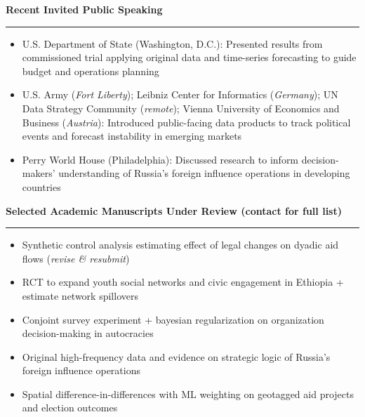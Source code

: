 \documentclass[11pt]{article}
\begin{document}

\textbf{\large Recent Invited Public Speaking}\\
\rule[3mm]{\textwidth}{.2pt}
\vspace{-25pt}
\begin{itemize} \itemsep -5pt
  \item U.S. Department of State (Washington, D.C.): Presented results from commissioned trial applying original data and time-series forecasting to guide budget and operations planning
  \item U.S. Army (\textit{Fort Liberty}); Leibniz Center for Informatics (\textit{Germany}); UN Data Strategy Community (\textit{remote}); Vienna University of Economics and Business (\textit{Austria}): Introduced public-facing data products to track political events and forecast instability in emerging markets
  \item Perry World House (Philadelphia): Discussed research to inform decision-makers' understanding of Russia's foreign influence operations in developing countries
\end{itemize}


\textbf{\large Selected Academic Manuscripts Under Review (contact for full list)}\\
\rule[3mm]{\textwidth}{.2pt}
\vspace{-25pt}
\begin{itemize} \itemsep -5pt
  \item Synthetic control analysis estimating effect of legal changes on dyadic aid flows (\textit{revise \& resubmit})
  \item RCT to expand youth social networks and civic engagement in Ethiopia + estimate network spillovers
  \item Conjoint survey experiment + bayesian regularization on organization decision-making in autocracies
  \item Original high-frequency data and evidence on strategic logic of Russia's foreign influence operations 
  \item Spatial difference-in-differences with ML weighting on geotagged aid projects and election outcomes
\end{itemize}
\end{document}
